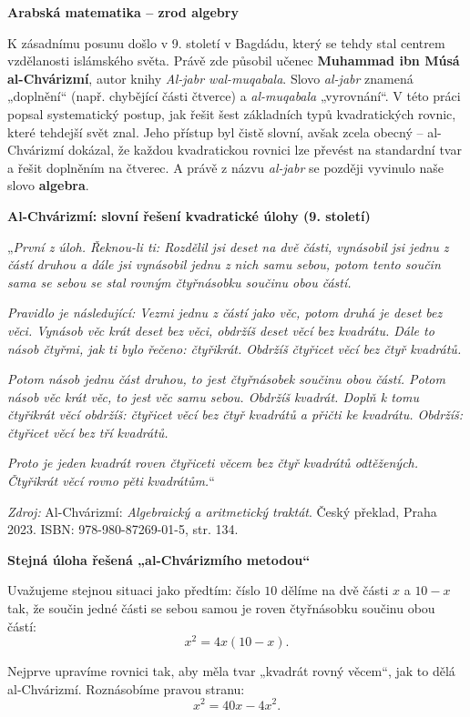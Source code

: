 \documentclass[12pt,a4paper]{article}
\begin{document}
\begin{historicalbox}
\medskip
\textbf{Arabská matematika – zrod algebry}

K zásadnímu posunu došlo v 9. století v Bagdádu, 
který se tehdy stal centrem vzdělanosti islámského světa. 
Právě zde působil učenec \textbf{Muhammad ibn Músá al-Chvárizmí}, 
autor knihy \textit{Al-jabr wal-muqabala}. 
Slovo \textit{al-jabr} znamená „doplnění“ (např. chybějící části čtverce) 
a \textit{al-muqabala} „vyrovnání“. V této práci popsal systematický postup, 
jak řešit šest základních typů kvadratických rovnic, které tehdejší svět znal.  
Jeho přístup byl čistě slovní, avšak zcela obecný – al-Chvárizmí dokázal, 
že každou kvadratickou rovnici lze převést na standardní tvar a 
řešit doplněním na čtverec. 
A právě z názvu \emph{al-jabr} se později vyvinulo naše slovo \textbf{algebra}.

\textbf{Al-Chvárizmí: slovní řešení kvadratické úlohy (9. století)}

„\textit{První z úloh. Řeknou-li ti: Rozdělil jsi deset na dvě části, vynásobil jsi jednu z částí druhou a dále jsi vynásobil jednu z nich samu sebou, potom tento součin sama se sebou se stal rovným čtyřnásobku součinu obou částí.}

\textit{Pravidlo je následující: Vezmi jednu z částí jako věc, potom druhá je deset bez věci. Vynásob věc krát deset bez věci, obdržíš deset věcí bez kvadrátu. Dále to násob čtyřmi, jak ti bylo řečeno: čtyřikrát. Obdržíš čtyřicet věcí bez čtyř kvadrátů.}

\textit{Potom násob jednu část druhou, to jest čtyřnásobek součinu obou částí. Potom násob věc krát věc, to jest věc samu sebou. Obdržíš kvadrát. Doplň k tomu čtyřikrát věcí obdržíš: čtyřicet věcí bez čtyř kvadrátů a přičti ke kvadrátu. Obdržíš: čtyřicet věcí bez tří kvadrátů.}

\textit{Proto je jeden kvadrát roven čtyřiceti věcem bez čtyř kvadrátů odtěžených. Čtyřikrát věcí rovno pěti kvadrátům.}“

\smallskip
\textit{Zdroj:}  
Al-Chvárizmí: \textit{Algebraický a aritmetický traktát}.  
Český překlad, Praha 2023.  
ISBN: 978-980-87269-01-5, str. 134.


\textbf{Stejná úloha řešená „al-Chvárizmího metodou“}

Uvažujeme stejnou situaci jako předtím: číslo \(10\) dělíme na dvě části \(x\) a \(10-x\) tak,  
že součin jedné části se sebou samou je roven čtyřnásobku součinu obou částí:
\[
x^2 = 4x(10-x).
\]

Nejprve upravíme rovnici tak, aby měla tvar „kvadrát rovný věcem“, jak to dělá al-Chvárizmí.  
Roznásobíme pravou stranu:
\[
x^2 = 40x - 4x^2.
\]


\end{historicalbox}
\end{document}
